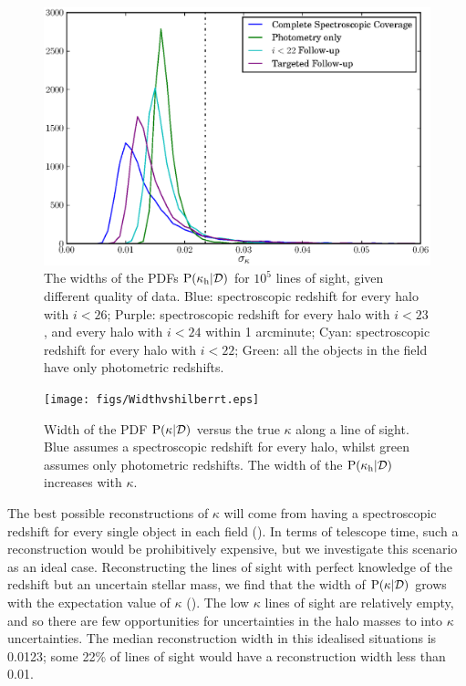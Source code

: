 \documentclass[useAMS,usenatbib]{mn2e}
\begin{document}
\begin{figure}
\includegraphics[width=\columnwidth]{figs/Width.eps}
\caption{The widths of the \infered PDFs ${\rm P}(\kappa_{\rm h}|{\mathcal{D}})$ for
$10^5$ lines of sight, given different quality of data. Blue:
spectroscopic redshift for every halo with $i<26$; Purple: 
spectroscopic redshift for every halo with $i<23$, and every halo with $i<24$
within 1 arcminute; Cyan: spectroscopic redshift for every halo with $i<22$; 
Green: all the objects in the field have only photometric redshifts.}
\label{fig:reconwidths}
\end{figure}

\begin{figure}
\texttt{[image: figs/Widthvshilberrt.eps]}
\caption{Width of the \infered PDF ${\rm P}(\kappa|{\mathcal{D}})$ versus the true
$\kappa$ along a line of sight. Blue assumes a spectroscopic redshift for
every halo, whilst green assumes only photometric redshifts. The width of the
\infered ${\rm P}(\kappa_{\rm h}|{\mathcal{D}})$ increases with $\kappa$.}

\label{fig:widthsvsH}
\end{figure}

The best possible reconstructions of $\kappa$ will come from having a
spectroscopic redshift for every single object in each field
().  In terms of telescope time, such a reconstruction
would be prohibitively expensive, but we investigate this scenario as an ideal
case. Reconstructing the lines of sight with perfect knowledge of the redshift
but an uncertain stellar mass, we find that the width of ${\rm P}(\kappa|{\mathcal{D}})$
grows with the expectation value of $\kappa$ (). The low
$\kappa$ lines of sight are relatively empty, and so there are few
opportunities for uncertainties in the halo masses to \propogate into $\kappa$
uncertainties. The median reconstruction width in this idealised situations is
0.0123; some 22\% of lines of sight would have a reconstruction width less
than 0.01. 
\end{document}
